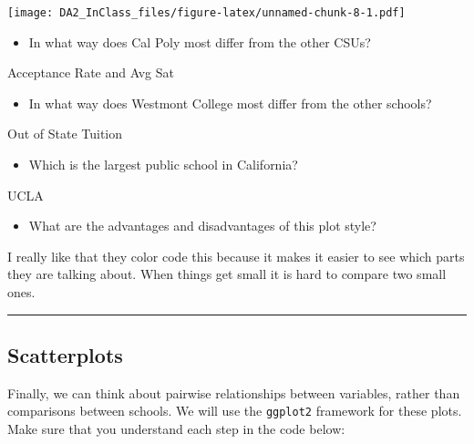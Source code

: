 \documentclass[]{article}
\newenvironment{Shaded}{\begin{snugshade}}{\end{snugshade}}
\newcommand{\DataTypeTok}[1]{\textcolor[rgb]{0.13,0.29,0.53}{#1}}
\newcommand{\KeywordTok}[1]{\textcolor[rgb]{0.13,0.29,0.53}{\textbf{#1}}}
\newcommand{\NormalTok}[1]{#1}
\newcommand{\OperatorTok}[1]{\textcolor[rgb]{0.81,0.36,0.00}{\textbf{#1}}}
\newcommand{\StringTok}[1]{\textcolor[rgb]{0.31,0.60,0.02}{#1}}
\providecommand{\tightlist}{%
  \setlength{\itemsep}{0pt}\setlength{\parskip}{0pt}}
\begin{document}
\texttt{[image: DA2\_InClass\_files/figure-latex/unnamed-chunk-8-1.pdf]}

\begin{itemize}
\tightlist
\item
  In what way does Cal Poly most differ from the other CSUs?
\end{itemize}

Acceptance Rate and Avg Sat

\begin{itemize}
\tightlist
\item
  In what way does Westmont College most differ from the other schools?
\end{itemize}

Out of State Tuition

\begin{itemize}
\tightlist
\item
  Which is the largest public school in California?
\end{itemize}

UCLA

\begin{itemize}
\tightlist
\item
  What are the advantages and disadvantages of this plot style?
\end{itemize}

I really like that they color code this because it makes it easier to
see which parts they are talking about. When things get small it is hard
to compare two small ones.

\begin{center}\rule{0.5\linewidth}{\linethickness}\end{center}

\hypertarget{scatterplots}{%
\subsection{Scatterplots}\label{scatterplots}}

Finally, we can think about pairwise relationships between variables,
rather than comparisons between schools. We will use the
\texttt{ggplot2} framework for these plots. Make sure that you
understand each step in the code below:

\begin{Shaded}
\end{Shaded}
\end{document}
